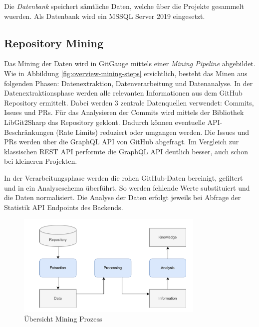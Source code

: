 Die \textit{Datenbank} speichert sämtliche Daten, welche über die Projekte gesammelt wuerden. Als Datenbank wird ein MSSQL Server 2019 eingesetzt. \parencite{grand_joel_vt1_joelgrand_repository_2024}

\subsection{Repository Mining}
Das Mining der Daten wird in GitGauge mittels einer \textit{Mining Pipeline} abgebildet. Wie in Abbildung \autoref{fig:overview-mining-steps} ersichtlich, besteht das Minen aus folgenden Phasen: Datenextraktion, Datenverarbeitung und Datenanalyse. 
In der Datenextraktionsphase werden alle relevanten Informationen aus dem GitHub Repository ermittelt. Dabei werden 3 zentrale Datenquellen verwendet: Commits, Issues und PRs. Für das Analysieren der Commits wird mittels der Bibliothek LibGit2Sharp das Repository geklont. Dadurch können eventuelle API-Beschränkungen (Rate Limits) reduziert oder umgangen werden. Die Issues und PRs werden über die GraphQL API von GitHub abgefragt. Im Vergleich zur klassischen REST API performte die GraphQL API deutlich besser, auch schon bei kleineren Projekten.  

In der Verarbeitungsphase werden die rohen GitHub-Daten bereinigt, gefiltert und in ein Analyseschema überführt. So werden fehlende Werte substituiert und die Daten normalisiert. 
Die Analyse der Daten erfolgt jeweils bei Abfrage der Statistik API Endpoints des Backends. 

\begin{figure}[htbp]
    \centering
    \includegraphics[width=0.8\textwidth]{Figures/uebersicht-mining-prozess.png}
    \caption{Übersicht Mining Prozess \parencite{grand_joel_vt1_joelgrand_repository_2024}}
    \label{fig:overview-mining-steps}
\end{figure}

